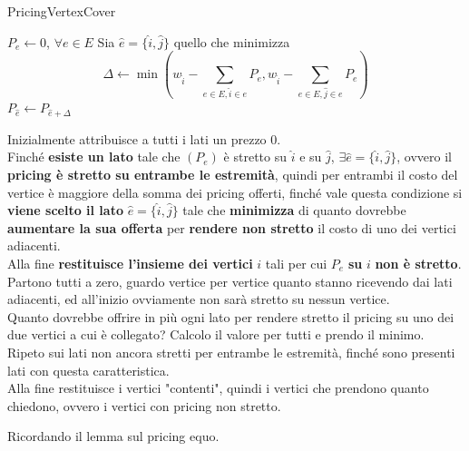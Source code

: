 \documentclass[11pt]{article}
\begin{document}
	\begin{algorithm}
		\caption{PricingVertexCover}
		\begin{algorithmic}
			\STATE $P_e \leftarrow 0$, $\forall e \in E$
				\STATE Sia $\hat{e} = \{\hat{i}, \hat{j}\}$ quello che minimizza 
				$$\Delta \leftarrow \min \left(w_{\hat{i}} - \sum_{e \in E, \hat{i} \in e} P_e, w_{\hat{i}} - \sum_{e \in E, \hat{j} \in e} P_e \right)$$
				\STATE $P_{\hat{e}} \leftarrow P_{\hat{e} + \Delta}$
			\ENDWHILE
		\end{algorithmic}
	\end{algorithm}
	
	Inizialmente attribuisce a tutti i lati un prezzo 0.\\
	
	Finché \textbf{esiste un lato} tale che $(P_e)$ è stretto su $\hat{i}$ e su $\hat{j}$, $\exists \hat{e} = \{\hat{i}, \hat{j}\}$, ovvero il \textbf{pricing è stretto su entrambe le estremità}, quindi per entrambi il costo del vertice è maggiore della somma dei pricing offerti, finché vale questa condizione si \textbf{viene scelto il lato} $\hat{e} = \{\hat{i}, \hat{j}\}$ tale che \textbf{minimizza} di quanto dovrebbe \textbf{aumentare la sua offerta} per \textbf{rendere non stretto} il costo di uno dei vertici adiacenti.\\
	
	Alla fine \textbf{restituisce l'insieme dei vertici} $i$ tali per cui $P_e$ \textbf{su} $i$ \textbf{non è stretto}.\\
	
	Partono tutti a zero, guardo vertice per vertice quanto stanno ricevendo dai lati adiacenti, ed all'inizio ovviamente non sarà stretto su nessun vertice.\\
	Quanto dovrebbe offrire in più ogni lato per rendere stretto il pricing su uno dei due vertici a cui è collegato? Calcolo il valore per tutti e prendo il minimo.\\
	Ripeto sui lati non ancora stretti per entrambe le estremità, finché sono presenti lati con questa caratteristica.\\
	
	Alla fine restituisce i vertici "contenti", quindi i vertici che prendono quanto chiedono, ovvero i vertici con pricing non stretto.
	

	\newpage
	
	Ricordando il lemma sul pricing equo.
	
\end{document}
